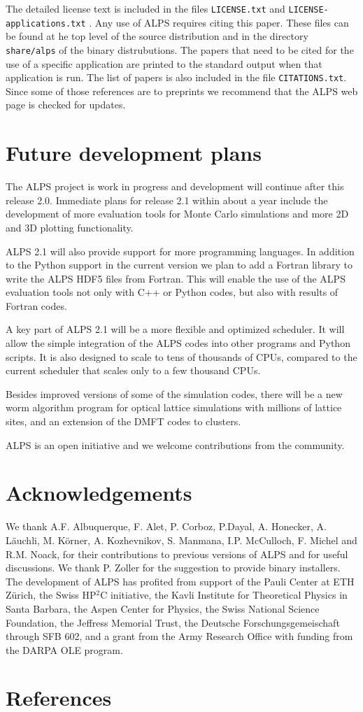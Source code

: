 \documentclass[12pt]{iopart}
\begin{document}
The detailed license text is included in the files {\tt LICENSE.txt} \cite{librarylicense} and {\tt LICENSE-applications.txt}  \cite{applicationlicense}. Any use of ALPS requires citing this paper.  These files can be found at he top level of the source distribution and in the directory {\tt share/alps} of the binary distrubutions. The papers that need to be cited for the use of a specific application are printed to the standard output when that application is run. The list of papers is also included in the file {\tt CITATIONS.txt}. Since some of those references are to preprints we recommend that the ALPS web page \cite{alps} is checked for updates.

\section{Future development plans}

The ALPS project is work in progress and development will continue after this release 2.0. Immediate plans for release 2.1 within about a year include the development of  more evaluation tools for Monte Carlo simulations and more 2D and 3D plotting functionality.

ALPS 2.1 will also provide support for more programming languages. In addition to the Python support in the current version we plan to add a Fortran library to write the ALPS HDF5 files from Fortran. This will enable the use of the ALPS evaluation tools not only with C++ or Python codes, but also with results of Fortran codes.

A key part of ALPS 2.1 will be a more flexible and optimized scheduler. It will allow  the simple integration of the ALPS codes into other programs and Python scripts. It is also designed to scale to tens of thousands of CPUs, compared to the current scheduler that scales only to a few thousand CPUs. 

Besides improved versions of some of the simulation codes, there will be a new worm algorithm program for optical lattice simulations with millions of lattice sites, and an extension of the DMFT codes to clusters.

ALPS is an open initiative and we welcome contributions from the community.


\section{Acknowledgements}

We thank A.F. Albuquerque, F. Alet, P. Corboz, P.Dayal, A. Honecker, A. L\"auchli, M. K\"orner,  A. Kozhevnikov, S. Manmana, I.P. McCulloch, F. Michel and R.M. Noack, for their contributions to previous versions of ALPS and  for useful discussions. We thank P. Zoller for the suggestion to provide binary installers. The development of ALPS has profited from support of the Pauli Center at ETH Z\"urich, the Swiss HP$^2$C initiative, the Kavli Institute for Theoretical Physics in Santa Barbara, the Aspen Center for Physics, the Swiss National Science Foundation, the Jeffress Memorial Trust, the Deutsche Forschungsgemeischaft through SFB 602, and a grant from the Army Research Office with funding from the DARPA OLE program.


\section*{References}



\end{document}

